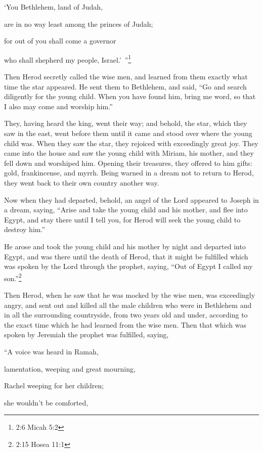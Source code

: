 \myverse{}‘You Bethlehem, land of Judah,

are in no way least among the princes of Judah;

for out of you shall come a governor

who shall shepherd my people, Israel.’ ”\footnote{2:6 Micah 5:2}

\myverse{}Then Herod secretly called the wise men, and learned from them
exactly what time the star appeared.
\myverse{}He sent them to Bethlehem, and said, “Go and search diligently for the young
child. When you have found him, bring me word, so that I also may come and worship him.”

\myverse{}They, having heard the king, went their way; and behold, the star,
which they saw in the east, went before them until it came and stood over where the young child was.
\myverse{}When they saw the star, they rejoiced with exceedingly great joy.
\myverse{}They came into the house and saw the young child with Miriam, his mother,
and they fell down and worshiped him. Opening their treasures, they offered to him gifts: gold, frankincense,
and myrrh.
\myverse{}Being warned in a dream not to return to Herod, they went back to their own
country another way.

\myverse{}Now when they had departed, behold, an angel of the Lord appeared
to Joseph in a dream, saying, “Arise and take the young child and his mother, and flee into Egypt, and
stay there until I tell you, for Herod will seek the young child to destroy him.”

\myverse{}He arose and took the young child and his mother by night and
departed into Egypt,
\myverse{}and was there until the death of Herod, that it might be fulfilled which was
spoken by the Lord through the prophet, saying, “Out of Egypt I called my son.”\footnote{2:15 Hosea 11:1}

\myverse{}Then Herod, when he saw that he was mocked by the wise men, was
exceedingly angry, and sent out and killed all the male children who were in Bethlehem and in all the
surrounding countryside, from two years old and under, according to the exact time which he had learned
from the wise men.
\myverse{}Then that which was spoken by Jeremiah the prophet was fulfilled, saying,

\myverse{}“A voice was heard in Ramah,

lamentation, weeping and great mourning,

Rachel weeping for her children;

she wouldn’t be comforted,

